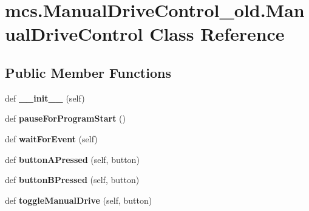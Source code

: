 \hypertarget{classmcs_1_1ManualDriveControl__old_1_1ManualDriveControl}{}\section{mcs.\+Manual\+Drive\+Control\+\_\+old.\+Manual\+Drive\+Control Class Reference}
\label{classmcs_1_1ManualDriveControl__old_1_1ManualDriveControl}
\subsection*{Public Member Functions}
\begin{DoxyCompactItemize}
\item 
\mbox{\label{classmcs_1_1ManualDriveControl__old_1_1ManualDriveControl_a2208e1b523bc01c6dba45e8e309f99fe}} 
def {\bfseries \+\_\+\+\_\+init\+\_\+\+\_\+} (self)
\item 
\mbox{\label{classmcs_1_1ManualDriveControl__old_1_1ManualDriveControl_a146b0eec1fe4696d149d0c392294c4b6}} 
def {\bfseries pause\+For\+Program\+Start} ()
\item 
\mbox{\label{classmcs_1_1ManualDriveControl__old_1_1ManualDriveControl_a232397152cc7fdef171fac3573f95a99}} 
def {\bfseries wait\+For\+Event} (self)
\item 
\mbox{\label{classmcs_1_1ManualDriveControl__old_1_1ManualDriveControl_a01c47c481adf1d1a00cb186a69b2f884}} 
def {\bfseries button\+A\+Pressed} (self, button)
\item 
\mbox{\label{classmcs_1_1ManualDriveControl__old_1_1ManualDriveControl_aac75cf38831363b89c270193a654901e}} 
def {\bfseries button\+B\+Pressed} (self, button)
\item 
\mbox{\label{classmcs_1_1ManualDriveControl__old_1_1ManualDriveControl_ae5509bef6bf54bd3dc1566c1ebd62a3e}} 
def {\bfseries toggle\+Manual\+Drive} (self, button)

\end{DoxyCompactItemize}
